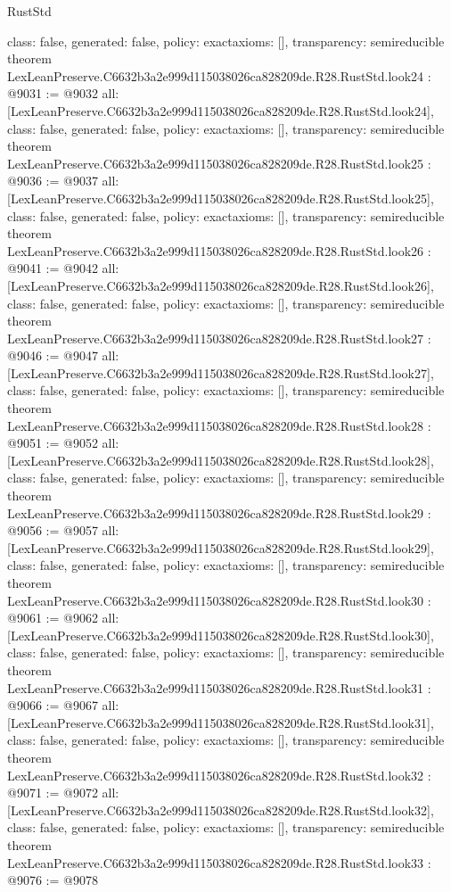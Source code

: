 \begin{lexlean}{RustStd}
\begin{coremodule}
{  class: false,
  generated: false,
  policy: exact{axioms: []},
  transparency: semireducible
}
theorem LexLeanPreserve.C6632b3a2e999d115038026ca828209de.R28.RustStd.look24 : @9031 := @9032 {
  all: [LexLeanPreserve.C6632b3a2e999d115038026ca828209de.R28.RustStd.look24],
  class: false,
  generated: false,
  policy: exact{axioms: []},
  transparency: semireducible
}
theorem LexLeanPreserve.C6632b3a2e999d115038026ca828209de.R28.RustStd.look25 : @9036 := @9037 {
  all: [LexLeanPreserve.C6632b3a2e999d115038026ca828209de.R28.RustStd.look25],
  class: false,
  generated: false,
  policy: exact{axioms: []},
  transparency: semireducible
}
theorem LexLeanPreserve.C6632b3a2e999d115038026ca828209de.R28.RustStd.look26 : @9041 := @9042 {
  all: [LexLeanPreserve.C6632b3a2e999d115038026ca828209de.R28.RustStd.look26],
  class: false,
  generated: false,
  policy: exact{axioms: []},
  transparency: semireducible
}
theorem LexLeanPreserve.C6632b3a2e999d115038026ca828209de.R28.RustStd.look27 : @9046 := @9047 {
  all: [LexLeanPreserve.C6632b3a2e999d115038026ca828209de.R28.RustStd.look27],
  class: false,
  generated: false,
  policy: exact{axioms: []},
  transparency: semireducible
}
theorem LexLeanPreserve.C6632b3a2e999d115038026ca828209de.R28.RustStd.look28 : @9051 := @9052 {
  all: [LexLeanPreserve.C6632b3a2e999d115038026ca828209de.R28.RustStd.look28],
  class: false,
  generated: false,
  policy: exact{axioms: []},
  transparency: semireducible
}
theorem LexLeanPreserve.C6632b3a2e999d115038026ca828209de.R28.RustStd.look29 : @9056 := @9057 {
  all: [LexLeanPreserve.C6632b3a2e999d115038026ca828209de.R28.RustStd.look29],
  class: false,
  generated: false,
  policy: exact{axioms: []},
  transparency: semireducible
}
theorem LexLeanPreserve.C6632b3a2e999d115038026ca828209de.R28.RustStd.look30 : @9061 := @9062 {
  all: [LexLeanPreserve.C6632b3a2e999d115038026ca828209de.R28.RustStd.look30],
  class: false,
  generated: false,
  policy: exact{axioms: []},
  transparency: semireducible
}
theorem LexLeanPreserve.C6632b3a2e999d115038026ca828209de.R28.RustStd.look31 : @9066 := @9067 {
  all: [LexLeanPreserve.C6632b3a2e999d115038026ca828209de.R28.RustStd.look31],
  class: false,
  generated: false,
  policy: exact{axioms: []},
  transparency: semireducible
}
theorem LexLeanPreserve.C6632b3a2e999d115038026ca828209de.R28.RustStd.look32 : @9071 := @9072 {
  all: [LexLeanPreserve.C6632b3a2e999d115038026ca828209de.R28.RustStd.look32],
  class: false,
  generated: false,
  policy: exact{axioms: []},
  transparency: semireducible
}
theorem LexLeanPreserve.C6632b3a2e999d115038026ca828209de.R28.RustStd.look33 : @9076 := @9078 {
}
\end{coremodule}
\end{lexlean}
